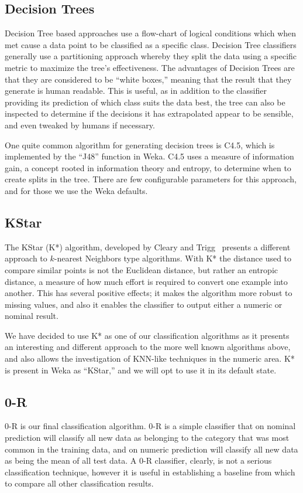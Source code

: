 \documentclass[../thesis/thesis.tex]{subfiles}
\begin{document}
\subsection{Decision Trees}
Decision Tree based approaches use a flow-chart of logical conditions which when met cause a data point to be classified as a specific class. Decision Tree classifiers generally use a partitioning approach whereby they split the data using a specific metric to maximize the tree's effectiveness. The advantages of Decision Trees are that they are considered to be ``white boxes,'' meaning that the result that they generate is human readable. This is useful, as in addition to the classifier providing its prediction of which class suits the data best, the tree can also be inspected to determine if the decisions it has extrapolated appear to be sensible, and even tweaked by humans if necessary.

One quite common algorithm for generating decision trees is C4.5, which is implemented by the ``J48'' function in Weka. C4.5 uses a measure of information gain, a concept rooted in information theory and entropy, to determine when to create splits in the tree. There are few configurable parameters for this approach, and for those we use the Weka defaults.

\subsection{KStar}
The KStar (K*) algorithm, developed by Cleary and Trigg~\cite{cleary1995k} presents a different approach to $k$-nearest Neighbors type algorithms. With K* the distance used to compare similar points is not the Euclidean distance, but rather an entropic distance, a measure of how much effort is required to convert one example into another. This has several positive effects; it makes the algorithm more robust to missing values, and also it enables the classifier to output either a numeric or nominal result.

We have decided to use K* as one of our classification algorithms as it presents an interesting and different approach to the more well known algorithms above, and also allows the investigation of KNN-like techniques in the numeric area. K* is present in Weka as ``KStar,'' and we will opt to use it in its default state.

\subsection{0-R}
0-R is our final classification algorithm. 0-R is a simple classifier that on nominal prediction will classify all new data as belonging to the category that was most common in the training data, and on numeric prediction will classify all new data as being the mean of all test data. A 0-R classifier, clearly, is not a serious classification technique, however it is useful in establishing a baseline from which to compare all other classification results.
\end{document}
